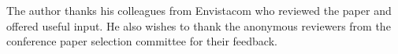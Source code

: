 \documentclass[conference]{IEEEtran}
\begin{document}
The author thanks his colleagues from Envistacom who reviewed the paper and offered useful input.  He also wishes to thank the anonymous reviewers from the conference paper selection committee for their feedback.


%

\end{document}
